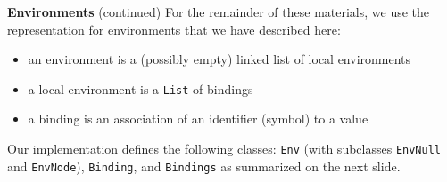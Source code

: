 \begin{minipage}[t]{\sw}
\slidenumber
\LARGE
{\bf Environments} (continued)\exx
For the remainder of these materials,
we use the representation for environments
that we have described here:
\begin{itemize}
\item an environment is a (possibly empty) linked list of local environments
\item a local environment is a \verb'List' of bindings
\item a binding is an association of an identifier (symbol) to a value
\end{itemize}
Our implementation defines the following classes:
\verb'Env' (with subclasses \verb'EnvNull' and \verb'EnvNode'),
\verb'Binding', and \verb'Bindings'
as summarized on the next slide.\exx
\end{minipage}
\clearpage
